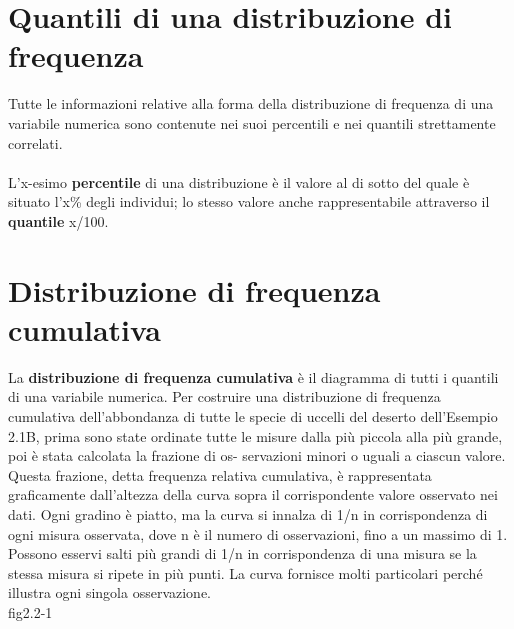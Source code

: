 \documentclass[drafts, 10pt]{book}
\begin{document}
\section{Quantili di una distribuzione di frequenza}
Tutte le informazioni relative alla forma della distribuzione di frequenza di una variabile numerica sono contenute nei suoi percentili e nei quantili strettamente correlati. 
\\
\\
L'x-esimo \textbf{percentile} di una distribuzione è il valore al di sotto del quale è situato l'x\% degli individui; lo stesso valore anche rappresentabile attraverso il \textbf{quantile} x/100.

\section{Distribuzione di frequenza cumulativa}
La \textbf{distribuzione di frequenza cumulativa} è il diagramma di tutti i quantili di una variabile numerica. Per costruire una distribuzione di frequenza cumulativa dell'abbondanza di tutte le specie di uccelli del deserto dell'Esempio 2.1B, prima sono state ordinate tutte le misure dalla più piccola alla più grande, poi è stata calcolata la frazione di os- servazioni minori o uguali a ciascun valore. Questa frazione, detta frequenza relativa cumulativa, è rappresentata graficamente dall'altezza della curva sopra il corrispondente valore osservato nei dati. Ogni gradino è piatto, ma la curva si innalza di 1/n in corrispondenza di ogni misura osservata, dove n è il numero di osservazioni, fino a un massimo di 1. Possono esservi salti più grandi di 1/n in corrispondenza di una misura se la stessa misura si ripete in più punti. La curva fornisce molti particolari perché illustra ogni singola osservazione.
\\
fig2.2-1\label{fig2.2-1}
\end{document}
